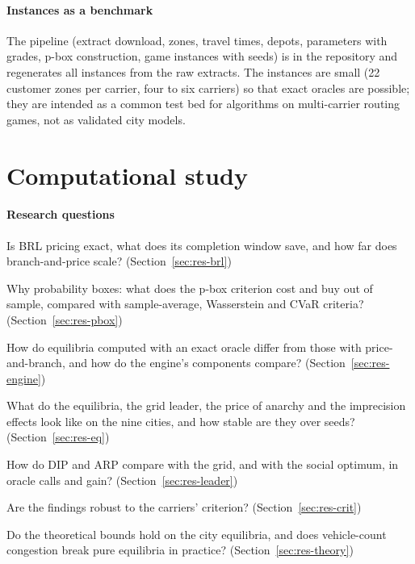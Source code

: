 \documentclass[preprint,12pt]{elsarticle}
\theoremstyle{definition}
\theoremstyle{remark}
\begin{document}
\paragraph{Instances as a benchmark} The pipeline (extract download, zones, travel times, depots, parameters with grades, p-box construction, game instances with seeds) is in the repository and regenerates all instances from the raw extracts. The instances are small (22 customer zones per carrier, four to six carriers) so that exact oracles are possible; they are intended as a common test bed for algorithms on multi-carrier routing games, not as validated city models.

\section{Computational study}\label{sec:results}

\paragraph{Research questions}
\begin{description}[itemsep=0pt]
\item[RQ1] Is BRL pricing exact, what does its completion window save, and how far does branch-and-price scale? (Section~\ref{sec:res-brl})
\item[RQ2] Why probability boxes: what does the p-box criterion cost and buy out of sample, compared with sample-average, Wasserstein and CVaR criteria? (Section~\ref{sec:res-pbox})
\item[RQ3] How do equilibria computed with an exact oracle differ from those with price-and-branch, and how do the engine's components compare? (Section~\ref{sec:res-engine})
\item[RQ4] What do the equilibria, the grid leader, the price of anarchy and the imprecision effects look like on the nine cities, and how stable are they over seeds? (Section~\ref{sec:res-eq})
\item[RQ5] How do DIP and ARP compare with the grid, and with the social optimum, in oracle calls and gain? (Section~\ref{sec:res-leader})
\item[RQ6] Are the findings robust to the carriers' criterion? (Section~\ref{sec:res-crit})
\item[RQ7] Do the theoretical bounds hold on the city equilibria, and does vehicle-count congestion break pure equilibria in practice? (Section~\ref{sec:res-theory})
\end{description}
\end{document}
